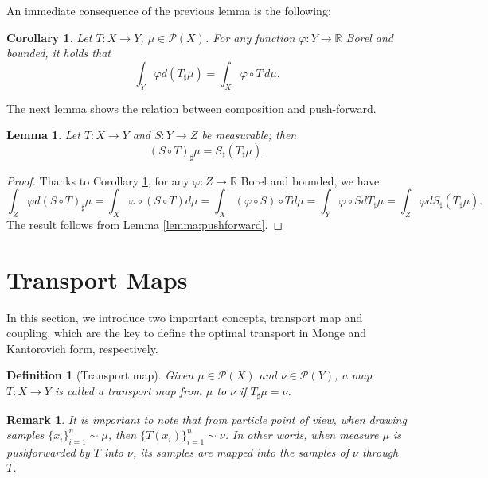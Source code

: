 \documentclass[11pt]{book}
\newtheorem{corollary}[theorem]{Corollary}
\newtheorem{lemma}[theorem]{Lemma}
\newtheorem{definition}[theorem]{Definition}
\newtheorem{remark}[theorem]{Remark}
\begin{document}
An immediate consequence of the previous lemma is the following:

\begin{corollary}\label{corollary:pushforward}
Let \(T: X \rightarrow Y\), \(\mu \in \mathcal{P}(X)\). For any function \(\varphi: Y \rightarrow \mathbb{R}\) Borel and bounded, it holds that
\[
\int_Y \varphi d(T_\sharp\mu) = \int_X \varphi \circ T \, d\mu.
\]
\end{corollary}

The next lemma shows the relation between composition and push-forward.




\begin{lemma}\label{pushforward:composition}
Let \(T: X \rightarrow Y\) and \(S: Y \rightarrow Z\) be measurable; then
\[
(S \circ T)_\sharp\mu = S_\sharp(T_\sharp\mu).
\]
\end{lemma}

\begin{proof}
Thanks to Corollary \ref{corollary:pushforward}, for any \(\varphi: Z \rightarrow \mathbb{R}\) Borel and bounded, we have
\[
\int_Z \varphi d(S \circ T)_\sharp\mu = \int_X \varphi \circ (S \circ T) d\mu = \int_X (\varphi \circ S) \circ T d\mu = \int_Y \varphi \circ S dT_\sharp\mu = \int_Z \varphi dS_\sharp(T_\sharp\mu).
\]
The result follows from Lemma \ref{lemma:pushforward}.
\end{proof}







\section[Transport]{Transport Maps}

In this section, we introduce two important concepts, transport map and coupling, which are the key to define the optimal transport in Monge and Kantorovich form, respectively.

\begin{definition}[Transport map]
Given \(\mu \in \mathcal{P}(X)\) and \(\nu \in \mathcal{P}(Y)\), a map \(T: X \rightarrow Y\) is called a transport map from \(\mu\) to \(\nu\) if \(T_\sharp\mu = \nu\).
\end{definition}

\begin{remark}
It is important to note that from particle point of view, when drawing samples $\{x_i\}_{i=1}^n \sim \mu$, then $\{T(x_i)\}_{i=1}^n \sim \nu$. In other words, when measure $\mu$ is pushforwarded by $T$ into $\nu$, its samples are mapped into the samples of $\nu$ through $T$. 
\end{remark}
\end{document}
